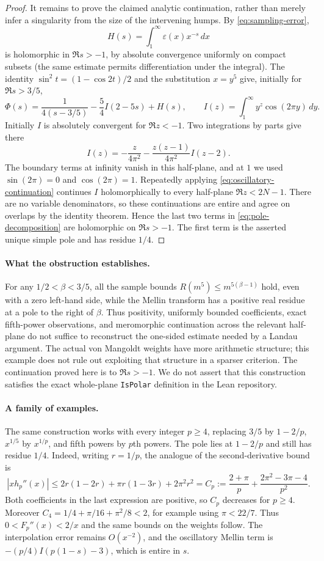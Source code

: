 \begin{proof}
It remains to prove the claimed analytic continuation, rather than merely
infer a singularity from the size of the intervening humps.  By
\eqref{eq:sampling-error},
\[
                 H(s)=\int_1^\infty\varepsilon(x)x^{-s}\,dx
\]
is holomorphic in $\Re s>-1$, by absolute convergence uniformly on compact
subsets (the same estimate permits differentiation under the integral).
The identity $\sin^2t=(1-\cos2t)/2$ and the substitution $x=y^5$ give,
initially for $\Re s>3/5$,
\[
 \Phi(s)=\frac1{4(s-3/5)}
          -\frac54 I(2-5s)+H(s),
 \qquad
 I(z)=\int_1^\infty y^z\cos(2\pi y)\,dy.
\tag{S5}\label{eq:pole-decomposition}
\]
Initially $I$ is absolutely convergent for $\Re z<-1$.  Two integrations
by parts give there
\[
               I(z)=-\frac{z}{4\pi^2}
                     -\frac{z(z-1)}{4\pi^2}I(z-2).
\tag{S6}\label{eq:oscillatory-continuation}
\]
The boundary terms at infinity vanish in this half-plane, and at $1$ we
used $\sin(2\pi)=0$ and $\cos(2\pi)=1$.  Repeatedly applying
\eqref{eq:oscillatory-continuation} continues $I$ holomorphically to every
half-plane $\Re z<2N-1$.  There are no variable denominators, so these
continuations are entire and agree on overlaps by the identity theorem.
Hence the last two terms in \eqref{eq:pole-decomposition} are holomorphic
on $\Re s>-1$.  The first term is the asserted unique simple pole and has
residue $1/4$.
\end{proof}

\paragraph{What the obstruction establishes.}
For any $1/2<\beta<3/5$, all the sample bounds
$R(m^5)\leq m^{5(\beta-1)}$ hold, even with a zero left-hand side, while
the Mellin transform has a positive real residue at a pole to the right
of $\beta$.  Thus positivity, uniformly bounded coefficients, exact
fifth-power observations, and meromorphic continuation across the
relevant half-plane do not suffice to reconstruct the one-sided estimate
needed by a Landau argument.  The actual von Mangoldt weights have more
arithmetic structure; this example does not rule out exploiting that
structure in a sparser criterion.  The continuation proved here is to
$\Re s>-1$.  We do not assert that this construction satisfies the exact
whole-plane \texttt{IsPolar} definition in the Lean repository.

\paragraph{A family of examples.}
The same construction works with every integer $p\geq4$, replacing
$3/5$ by $1-2/p$, $x^{1/5}$ by $x^{1/p}$, and fifth powers by $p$th
powers.  The pole lies at $1-2/p$ and still has residue $1/4$.
Indeed, writing $r=1/p$, the analogue of the second-derivative bound is
\[
 |xh_p''(x)|\leq 2r(1-2r)+\pi r(1-3r)+2\pi^2r^2
 =C_p:=\frac{2+\pi}{p}+\frac{2\pi^2-3\pi-4}{p^2}.
\]
Both coefficients in the last expression are positive, so $C_p$ decreases
for $p\geq4$.  Moreover
$C_4=1/4+\pi/16+\pi^2/8<2$, for example using $\pi<22/7$.
Thus $0<F_p''(x)<2/x$ and the same bounds on the weights follow.
The interpolation error remains $O(x^{-2})$, and the oscillatory Mellin
term is $-(p/4)I(p(1-s)-3)$, which is entire in $s$.
